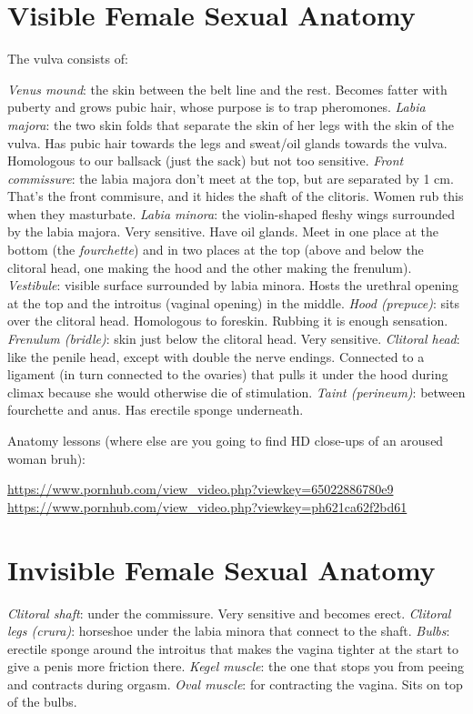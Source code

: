 \section{Visible Female Sexual Anatomy}
The vulva consists of:
\begin{outline}
\1 \emph{Venus mound}: the skin between the belt line and the rest. Becomes fatter with puberty and grows pubic hair, whose purpose is to trap pheromones.
\1 \emph{Labia majora}: the two skin folds that separate the skin of her legs with the skin of the vulva. Has pubic hair towards the legs and sweat/oil glands towards the vulva. Homologous to our ballsack (just the sack) but not too sensitive.
\1 \emph{Front commissure}: the labia majora don't meet at the top, but are separated by 1 cm. That's the front commisure, and it hides the shaft of the clitoris. Women rub this when they masturbate.
\1 \emph{Labia minora}: the violin-shaped fleshy wings surrounded by the labia majora. Very sensitive. Have oil glands. Meet in one place at the bottom (the \emph{fourchette}) and in two places at the top (above and below the clitoral head, one making the hood and the other making the frenulum).
\1 \emph{Vestibule}: visible surface surrounded by labia minora. Hosts the urethral opening at the top and the introitus (vaginal opening) in the middle.
\1 \emph{Hood (prepuce)}: sits over the clitoral head. Homologous to foreskin. Rubbing it is enough sensation.
\1 \emph{Frenulum (bridle)}: skin just below the clitoral head. Very sensitive.
\1 \emph{Clitoral head}: like the penile head, except with double the nerve endings. Connected to a ligament (in turn connected to the ovaries) that pulls it under the hood during climax because she would otherwise die of stimulation.
\1 \emph{Taint (perineum)}: between fourchette and anus. Has erectile sponge underneath.
\end{outline}

Anatomy lessons (where else are you going to find HD close-ups of an aroused woman bruh):
\begin{outline}
\1 \url{https://www.pornhub.com/view_video.php?viewkey=65022886780e9}
\1 \url{https://www.pornhub.com/view_video.php?viewkey=ph621ca62f2bd61}
\end{outline}

\section{Invisible Female Sexual Anatomy}
\begin{outline}
\1 \emph{Clitoral shaft}: under the commissure. Very sensitive and becomes erect.
\1 \emph{Clitoral legs (crura)}: horseshoe under the labia minora that connect to the shaft.
\1 \emph{Bulbs}: erectile sponge around the introitus that makes the vagina tighter at the start to give a penis more friction there.
\1 \emph{Kegel muscle}: the one that stops you from peeing and contracts during orgasm.
\1 \emph{Oval muscle}: for contracting the vagina. Sits on top of the bulbs.
\end{outline}

